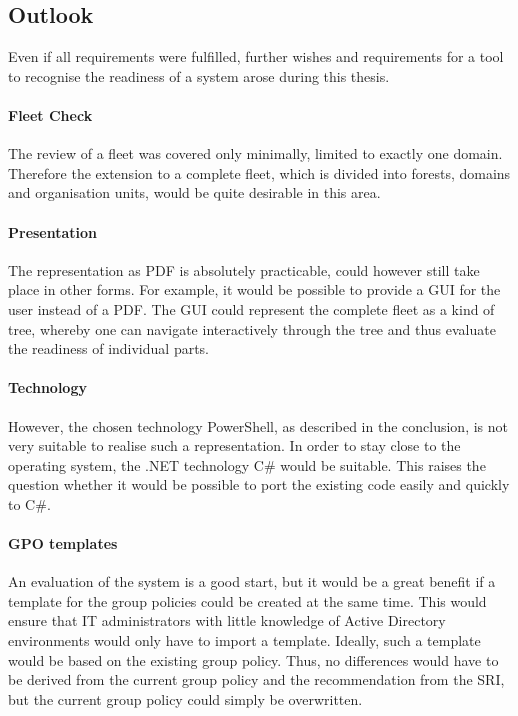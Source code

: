 \clearpage

\subsection{Outlook}
Even if all requirements were fulfilled, further wishes and requirements for a tool to recognise the readiness of a system arose during this thesis. 

\paragraph{Fleet Check}
The review of a fleet was covered only minimally, limited to exactly one domain. Therefore the extension to a complete fleet, which is divided into forests, domains and organisation units, would be quite desirable in this area. 

\paragraph{Presentation}
The representation as PDF is absolutely practicable, could however still take place in other forms. For example, it would be possible to provide a GUI for the user instead of a PDF. The GUI could represent the complete fleet as a kind of tree, whereby one can navigate interactively through the tree and thus evaluate the readiness of individual parts. 

\paragraph{Technology}
However, the chosen technology PowerShell, as described in the conclusion, is not very suitable to realise such a representation. In order to stay close to the operating system, the .NET technology C\# would be suitable. This raises the question whether it would be possible to port the existing code easily and quickly to C\#. 

\paragraph{GPO templates}
An evaluation of the system is a good start, but it would be a great benefit if a template for the group policies could be created at the same time. This would ensure that IT administrators with little knowledge of Active Directory environments would only have to import a template. Ideally, such a template would be based on the existing group policy. Thus, no differences would have to be derived from the current group policy and the recommendation from the SRI, but the current group policy could simply be overwritten.


